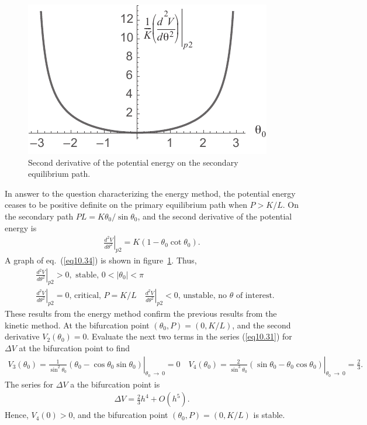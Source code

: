 \documentclass{AeroStructure-ERJohnson}
\begin{document}
\begin{figure}
\includegraphics{Figure_10-7.pdf}
\caption{Second derivative of the potential energy on the secondary equilibrium path.\label{fig10.7}}
\end{figure}
\noindent In answer to the question characterizing the energy method, the potential energy ceases to be positive definite on the primary equilibrium path when $P>K / L$. On the secondary path $P L=K \theta_{0} / \sin \theta_{0}$, and the second derivative of the potential energy is
\begin{align}\label{eq10.34}
\left.\frac{d^{2} V}{d \theta^{2}}\right|_{p 2}=K\left(1-\theta_{0} \cot \theta_{0}\right).
\end{align}
A graph of eq.~(\ref{eq10.34}) is shown in figure~\ref{fig10.7}. Thus,
\begin{align}\label{eq10.35}
&\left.\frac{d^{2} V}{d \theta^{2}}\right|_{p 2} >0, \text { stable, } 0<\left|\theta_{0}\right|<\pi \quad \nonumber\\
&\left.\frac{d^{2} V}{d \theta^{2}}\right|_{p 2}=0 \text {, critical, } P=K /\left.L \quad \frac{d^{2} V}{d \theta^{2}}\right|_{p 2}<0 \text {, unstable, no } \theta \text { of interest}.
\end{align}
These results from the energy method confirm the previous results from the kinetic method. At the bifurcation point $\left(\theta_{0}, P\right)=(0, K / L)$, and the second derivative $V_{2}\left(\theta_{0}\right)=0$. Evaluate the next two terms in the series (\ref{eq10.31}) for $\Delta V$ at the bifurcation point to find
\begin{align}\label{eq10.36}
V_{3}\left(\theta_{0}\right)=\left.\frac{1}{\sin ^{2} \theta_{0}}\left(\theta_{0}-\cos \theta_{0} \sin \theta_{0}\right)\right|_{\theta_{0}\ \rightarrow\ 0}=0 \quad V_{4}\left(\theta_{0}\right)=\left.\frac{2}{\sin ^{3} \theta_{0}}\left(\sin \theta_{0}-\theta_{0} \cos \theta_{0}\right)\right|_{\theta_{0}\ \rightarrow\ 0}=\frac{2}{3}.
\end{align}
The series for $\Delta V$ a the bifurcation point is
\begin{align}\label{eq10.37}
\Delta V=\frac{2}{3} h^{4}+O\left(h^{5}\right).
\end{align}
Hence, $V_{4}(0)>0$, and the bifurcation point $\left(\theta_{0}, P\right)=(0, K / L)$ is stable.
\end{document}
